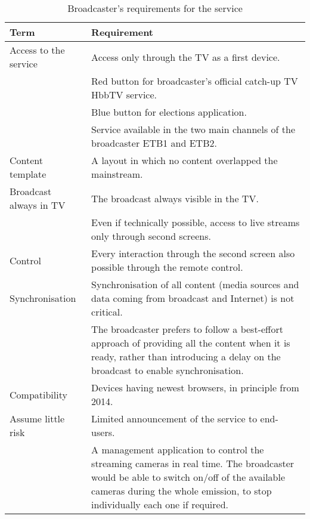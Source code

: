 \begin{table}
	\begin{center}
		\caption{Broadcaster's requirements for the service}\label{tab:eitbrequirements}
		\begin{tabular}{||l|p{10cm}||}
			\hline
			Term & Requirement \\
			\hline
			Access to the service & 
			Access only through the TV as a first device. \\
			&Red button for broadcaster’s official catch-up TV HbbTV service. \\		
			& Blue button for elections application. \\
			& Service available in the two main channels of the broadcaster ETB1 and ETB2.\\ 		
			\hline
			Content template & 
			A layout in which no content overlapped the mainstream. 
			\\
			\hline
			Broadcast always in TV
			& The broadcast always visible in the TV. \\
			& Even if technically possible, access to live streams only through second screens.\\
			\hline
			Control & 
			Every interaction through the second screen also possible through the remote control. \\
			\hline		
			Synchronisation
			&Synchronisation of all content (media sources and data coming from broadcast and Internet) is not critical. \\
			&The broadcaster prefers to follow a best-effort approach of providing all the content when it is ready, rather than introducing a delay on the broadcast to enable synchronisation.\\
			\hline	
			
			Compatibility &   
			Devices having newest browsers, in principle from 2014.			
			\\
			\hline
			Assume little risk  
			& Limited announcement of the service to end-users. \\
			& A management application to control the streaming cameras in real time. The broadcaster would be able to switch on/off of the available cameras during the whole emission, to stop individually each one if required.  
			\\
			\hline
			
			
		\end{tabular}
	\end{center}
\end{table}

